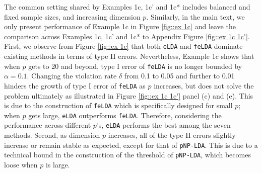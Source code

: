 \documentclass[12pt]{article}
\numberwithin{equation}{section}
\theoremstyle{remark}
\newcommand{\1}{{\rm 1}\kern-0.24em{\rm I}}
\begin{document}
The common setting shared by Examples 1c,  1c' and 1c* includes balanced and fixed sample sizes, and increasing dimension $p$.  Similarly,  in the main text, we only present performance of Example 1c in Figure \ref{fig::ex 1c} and leave the comparison across Examples 1c,  1c' and 1c* to Appendix Figure \ref{fig::ex 1c 1c'}.  First,  we observe from Figure \ref{fig::ex 1c} that both \verb+eLDA+ and \verb+feLDA+ dominate existing methods in terms of type II errors.  Nevertheless,  Example 1c shows that when $p$ gets to 20 and beyond,  type I error of \verb+feLDA+ is no longer bounded by $\alpha=0.1$.  Changing the violation rate $\delta$ from 0.1 to 0.05 and further to 0.01 hinders the growth of type I error of \verb+feLDA+ as $p$ increases, but does not solve the problem ultimately as illustrated in Figure \ref{fig::ex 1c 1c'} panel (c) and (e).  This is due to the construction of \verb+feLDA+ which is specifically designed for small $p$; when $p$ gets large,  \verb+eLDA+ outperforms \verb+feLDA+. Therefore, considering the performance across different $p$'s,  \verb+eLDA+ performs the best among the seven methods. Second,  as dimension $p$ increases, all of the type II errors slightly increase or remain stable as expected,  except for that of \verb+pNP-LDA+.  This is due to a technical bound in the construction of the threshold of \verb+pNP-LDA+, which becomes loose when $p$ is large.  %
\end{document}

